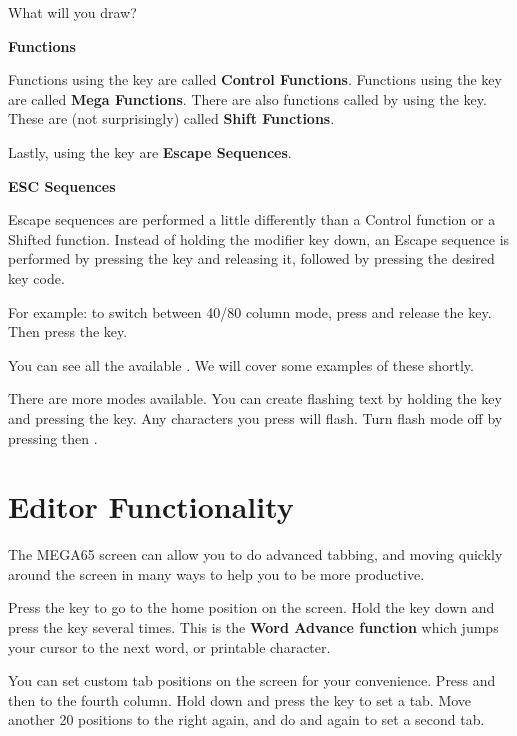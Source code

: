 What will you draw?

\needspace{2cm}
\textbf{Functions}

Functions using the  key are called \textbf{Control Functions}.
Functions using the \megasymbolkey key are called \textbf{Mega Functions}. There are also functions called by using the  key. These are (not surprisingly) called \textbf{Shift Functions}.

Lastly, using the  key are \textbf{Escape Sequences}.

\needspace{2cm}
\textbf{ESC Sequences}

Escape sequences are performed a little differently than a Control function or a Shifted function. Instead of holding the modifier key down, an Escape sequence is performed by pressing the  key and releasing it, followed by pressing the desired key code.

For example: to switch between 40/80 column mode, press and release the  key. Then press the  key.

You can see all the available . We will cover some examples of these shortly.

There are more modes available. You can create flashing text by holding the  key and pressing the  key. Any characters you press will flash. Turn flash mode off by pressing  then .



\section{Editor Functionality}


The MEGA65 screen can allow you to do advanced tabbing, and moving quickly around the screen in many ways to help you to be more productive.

Press the  key to go to the home position on the screen. Hold the  key down and press the  key several times. This is the \textbf{Word Advance function} which jumps your cursor to the next word, or printable character.

You can set custom tab positions on the screen for your convenience. Press  and then \megakey{$\rightarrow$} to the fourth column. Hold down  and press the  key to set a tab. Move another 20 positions to the right again, and do  and  again to set a second tab.

